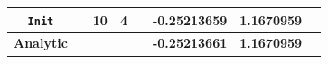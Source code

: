 \begin{tabular*}{\textwidth}{@{\extracolsep\fill}cccccccc@{}}
  \texttt{Init}   &  \Spherical{} &   10   & 4 &   \;8 & -0.25213659   &          1.1670959 \\
  \midrule                                 
  \textbf{Analytic} &              &        &   &&\textbf{-0.25213661}  &  \textbf{1.1670959} \\
%
\bottomrule
\end{tabular*}
